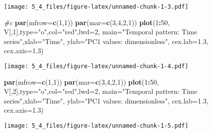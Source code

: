 \documentclass[]{article}
\newenvironment{Shaded}{\begin{snugshade}}{\end{snugshade}}
\newcommand{\KeywordTok}[1]{\textcolor[rgb]{0.13,0.29,0.53}{\textbf{#1}}}
\newcommand{\DataTypeTok}[1]{\textcolor[rgb]{0.13,0.29,0.53}{#1}}
\newcommand{\DecValTok}[1]{\textcolor[rgb]{0.00,0.00,0.81}{#1}}
\newcommand{\FloatTok}[1]{\textcolor[rgb]{0.00,0.00,0.81}{#1}}
\newcommand{\StringTok}[1]{\textcolor[rgb]{0.31,0.60,0.02}{#1}}
\newcommand{\CommentTok}[1]{\textcolor[rgb]{0.56,0.35,0.01}{\textit{#1}}}
\newcommand{\OperatorTok}[1]{\textcolor[rgb]{0.81,0.36,0.00}{\textbf{#1}}}
\newcommand{\NormalTok}[1]{#1}
\begin{document}
\texttt{[image: 5\_4\_files/figure-latex/unnamed-chunk-1-3.pdf]}

\begin{Shaded}
\begin{Highlighting}[]
\CommentTok{#c}
\KeywordTok{par}\NormalTok{(}\DataTypeTok{mfrow=}\KeywordTok{c}\NormalTok{(}\DecValTok{1}\NormalTok{,}\DecValTok{1}\NormalTok{))}
\KeywordTok{par}\NormalTok{(}\DataTypeTok{mar=}\KeywordTok{c}\NormalTok{(}\DecValTok{3}\NormalTok{,}\DecValTok{4}\NormalTok{,}\DecValTok{2}\NormalTok{,}\DecValTok{1}\NormalTok{))}
\KeywordTok{plot}\NormalTok{(}\DecValTok{1}\OperatorTok{:}\DecValTok{50}\NormalTok{, V[,}\DecValTok{1}\NormalTok{],}\DataTypeTok{type=}\StringTok{"o"}\NormalTok{,}\DataTypeTok{col=}\StringTok{"red"}\NormalTok{,}\DataTypeTok{lwd=}\DecValTok{2}\NormalTok{,}
     \DataTypeTok{main=}\StringTok{"Temporal pattern: Time series"}\NormalTok{,}\DataTypeTok{xlab=}\StringTok{"Time"}\NormalTok{,}
     \DataTypeTok{ylab=}\StringTok{"PC1 values: dimensionless"}\NormalTok{,}
     \DataTypeTok{cex.lab=}\FloatTok{1.3}\NormalTok{, }\DataTypeTok{cex.axis=}\FloatTok{1.3}\NormalTok{)}
\end{Highlighting}
\end{Shaded}

\texttt{[image: 5\_4\_files/figure-latex/unnamed-chunk-1-4.pdf]}

\begin{Shaded}
\begin{Highlighting}[]
\KeywordTok{par}\NormalTok{(}\DataTypeTok{mfrow=}\KeywordTok{c}\NormalTok{(}\DecValTok{1}\NormalTok{,}\DecValTok{1}\NormalTok{))}
\KeywordTok{par}\NormalTok{(}\DataTypeTok{mar=}\KeywordTok{c}\NormalTok{(}\DecValTok{3}\NormalTok{,}\DecValTok{4}\NormalTok{,}\DecValTok{2}\NormalTok{,}\DecValTok{1}\NormalTok{))}
\KeywordTok{plot}\NormalTok{(}\DecValTok{1}\OperatorTok{:}\DecValTok{50}\NormalTok{, V[,}\DecValTok{2}\NormalTok{],}\DataTypeTok{type=}\StringTok{"o"}\NormalTok{,}\DataTypeTok{col=}\StringTok{"red"}\NormalTok{,}\DataTypeTok{lwd=}\DecValTok{2}\NormalTok{,}
     \DataTypeTok{main=}\StringTok{"Temporal pattern: Time series"}\NormalTok{,}\DataTypeTok{xlab=}\StringTok{"Time"}\NormalTok{,}
     \DataTypeTok{ylab=}\StringTok{"PC1 values: dimensionless"}\NormalTok{,}
     \DataTypeTok{cex.lab=}\FloatTok{1.3}\NormalTok{, }\DataTypeTok{cex.axis=}\FloatTok{1.3}\NormalTok{)}
\end{Highlighting}
\end{Shaded}

\texttt{[image: 5\_4\_files/figure-latex/unnamed-chunk-1-5.pdf]}
\end{document}
